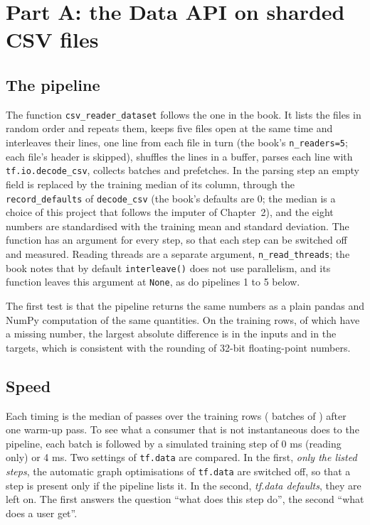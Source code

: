 \section{Part A: the Data API on sharded CSV files}
\label{sec:csv}

\subsection{The pipeline}

The function \texttt{csv\_reader\_dataset} follows the one in the book. It lists the files in random order and repeats them, keeps five files open at the same time and interleaves their lines, one line from each file in turn (the book's \texttt{n\_readers=5}; each file's header is skipped), shuffles the lines in a buffer, parses each line with \texttt{tf.io.decode\_csv}, collects batches and prefetches. In the parsing step an empty field is replaced by the training median of its column, through the \texttt{record\_defaults} of \texttt{decode\_csv} (the book's defaults are 0; the median is a choice of this project that follows the imputer of Chapter~2), and the eight numbers are standardised with the training mean and standard deviation. The function has an argument for every step, so that each step can be switched off and measured. Reading threads are a separate argument, \texttt{n\_read\_threads}; the book notes that by default \texttt{interleave()} does not use parallelism, and its function leaves this argument at \texttt{None}, as do pipelines 1 to 5 below.

The first test is that the pipeline returns the same numbers as a plain pandas and NumPy computation of the same quantities. On the  training rows, of which  have a missing number, the largest absolute difference is  in the inputs and  in the targets, which is consistent with the rounding of 32-bit floating-point numbers.

\subsection{Speed}

Each timing is the median of  passes over the training rows ( batches of ) after one warm-up pass. To see what a consumer that is not instantaneous does to the pipeline, each batch is followed by a simulated training step of 0 ms (reading only) or 4 ms. Two settings of \texttt{tf.data} are compared. In the first, \emph{only the listed steps}, the automatic graph optimisations of \texttt{tf.data} are switched off, so that a step is present only if the pipeline lists it. In the second, \emph{tf.data defaults}, they are left on. The first answers the question ``what does this step do'', the second ``what does a user get''.

